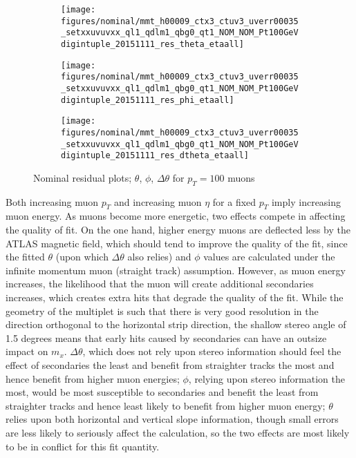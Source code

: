 \begin{figure}[!htbp]\captionsetup{justification=centering}
  \begin{center}
  \begin{subfigure}{0.3\textwidth}\texttt{[image: figures/nominal/mmt\_h00009\_ctx3\_ctuv3\_uverr00035\_setxxuvuvxx\_ql1\_qdlm1\_qbg0\_qt1\_NOM\_NOM\_Pt100GeVdigintuple\_20151111\_res\_theta\_etaall]}\end{subfigure}
  \begin{subfigure}{0.3\textwidth}\texttt{[image: figures/nominal/mmt\_h00009\_ctx3\_ctuv3\_uverr00035\_setxxuvuvxx\_ql1\_qdlm1\_qbg0\_qt1\_NOM\_NOM\_Pt100GeVdigintuple\_20151111\_res\_phi\_etaall]}\end{subfigure}
  \begin{subfigure}{0.3\textwidth}\texttt{[image: figures/nominal/mmt\_h00009\_ctx3\_ctuv3\_uverr00035\_setxxuvuvxx\_ql1\_qdlm1\_qbg0\_qt1\_NOM\_NOM\_Pt100GeVdigintuple\_20151111\_res\_dtheta\_etaall]}\end{subfigure}
  \caption{\label{fig:nomperf}Nominal residual plots; $\theta$, $\phi$, $\Delta\theta$ for $p_T=100$ \GeV muons}
  \end{center}
\end{figure}

Both increasing muon $p_T$ and increasing muon $\eta$ for a fixed $p_T$ imply increasing muon energy.  As muons become more energetic, two effects compete in affecting the quality of fit.  On the one hand, higher energy muons are deflected less by the ATLAS magnetic field, which should tend to improve the quality of the fit, since the fitted $\theta$ (upon which $\Delta\theta$ also relies) and $\phi$ values are calculated under the infinite momentum muon (straight track) assumption.  However, as muon energy increases, the likelihood that the muon will create additional secondaries increases, which creates extra hits that degrade the quality of the fit.  While the geometry of the multiplet is such that there is very good resolution in the direction orthogonal to the horizontal strip direction, the shallow stereo angle of 1.5 degrees means that early hits caused by secondaries can have an outsize impact on $m_x$.  $\Delta\theta$, which does not rely upon stereo information should feel the effect of secondaries the least and benefit from straighter tracks the most and hence benefit from higher muon energies; $\phi$, relying upon stereo information the most, would be most susceptible to secondaries and benefit the least from straighter tracks and hence least likely to benefit from higher muon energy; $\theta$ relies upon both horizontal and vertical slope information, though small errors are less likely to seriously affect the calculation, so the two effects are most likely to be in conflict for this fit quantity.  

